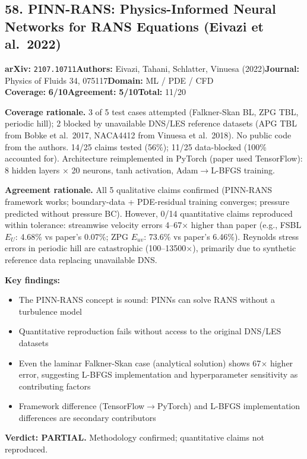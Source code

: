 \documentclass[11pt]{article}
\newcommand{\scorebadge}[2]{\textbf{#1:} \textbf{#2/10}}
\begin{document}
\subsection{58. PINN-RANS: Physics-Informed Neural Networks for RANS Equations (Eivazi et al.\ 2022)}
\textbf{arXiv:} \texttt{2107.10711}\quad\textbf{Authors:} Eivazi, Tahani, Schlatter, Vinuesa (2022)\quad\textbf{Journal:} Physics of Fluids 34, 075117\quad\textbf{Domain:} ML / PDE / CFD\\
\scorebadge{Coverage}{6}\quad\scorebadge{Agreement}{5}\quad\textbf{Total:} 11/20\par\smallskip
\noindent\textbf{Coverage rationale.} 3 of 5 test cases attempted (Falkner-Skan BL, ZPG TBL, periodic hill); 2 blocked by unavailable DNS/LES reference datasets (APG TBL from Bobke et al.\ 2017, NACA4412 from Vinuesa et al.\ 2018). No public code from the authors. 14/25 claims tested (56\%); 11/25 data-blocked (100\% accounted for). Architecture reimplemented in PyTorch (paper used TensorFlow): 8 hidden layers $\times$ 20 neurons, tanh activation, Adam$\to$L-BFGS training.\par
\noindent\textbf{Agreement rationale.} All 5 qualitative claims confirmed (PINN-RANS framework works; boundary-data + PDE-residual training converges; pressure predicted without pressure BC). However, 0/14 quantitative claims reproduced within tolerance: streamwise velocity errors 4--67$\times$ higher than paper (e.g., FSBL $E_U$: 4.68\% vs paper's 0.07\%; ZPG $E_{uv}$: 73.6\% vs paper's 6.46\%). Reynolds stress errors in periodic hill are catastrophic (100--13500$\times$), primarily due to synthetic reference data replacing unavailable DNS.\par\smallskip
\noindent\textbf{Key findings:}
\begin{itemize}[leftmargin=1.4em,itemsep=0.2em,topsep=0.2em]
\item The PINN-RANS concept is sound: PINNs can solve RANS without a turbulence model
\item Quantitative reproduction fails without access to the original DNS/LES datasets
\item Even the laminar Falkner-Skan case (analytical solution) shows 67$\times$ higher error, suggesting L-BFGS implementation and hyperparameter sensitivity as contributing factors
\item Framework difference (TensorFlow$\to$PyTorch) and L-BFGS implementation differences are secondary contributors
\end{itemize}
\noindent\textbf{Verdict: PARTIAL.} Methodology confirmed; quantitative claims not reproduced.
\end{document}
